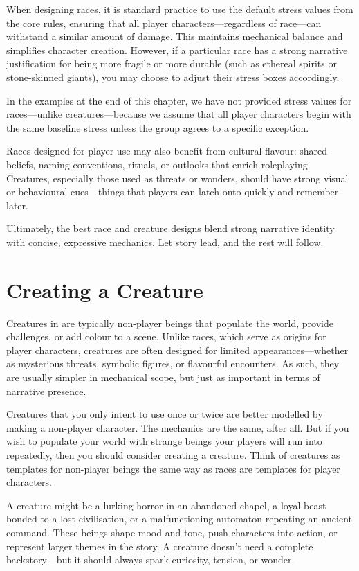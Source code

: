 When designing races, it is standard practice to use the default stress values from the core rules, ensuring that all player characters—regardless of race—can withstand a similar amount of damage. This maintains mechanical balance and simplifies character creation. However, if a particular race has a strong narrative justification for being more fragile or more durable (such as ethereal spirits or stone-skinned giants), you may choose to adjust their stress boxes accordingly.

In the examples at the end of this chapter, we have not provided stress values for races—unlike creatures—because we assume that all player characters begin with the same baseline stress unless the group agrees to a specific exception.

Races designed for player use may also benefit from cultural flavour: shared beliefs, naming conventions, rituals, or outlooks that enrich roleplaying. Creatures, especially those used as threats or wonders, should have strong visual or behavioural cues—things that players can latch onto quickly and remember later.

Ultimately, the best race and creature designs blend strong narrative identity with concise, expressive mechanics. Let story lead, and the rest will follow.


\section{Creating a Creature}

Creatures in \wyrd are typically non-player beings that populate the world, provide challenges, or add colour to a scene. Unlike races, which serve as origins for player characters, creatures are often designed for limited appearances—whether as mysterious threats, symbolic figures, or flavourful encounters. As such, they are usually simpler in mechanical scope, but just as important in terms of narrative presence.

Creatures that you only intent to use once or twice are better modelled by making a non-player character. The mechanics are the same, after all. But if you wish to populate your world with strange beings your players will run into repeatedly, then you should consider creating a creature. Think of creatures as templates for non-player beings the same way as races are templates for player characters.

A creature might be a lurking horror in an abandoned chapel, a loyal beast bonded to a lost civilisation, or a malfunctioning automaton repeating an ancient command. These beings shape mood and tone, push characters into action, or represent larger themes in the story. A creature doesn’t need a complete backstory—but it should always spark curiosity, tension, or wonder.

